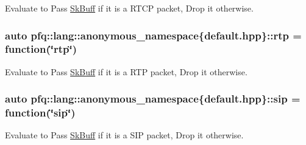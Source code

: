 Evaluate to {\ttfamily Pass} \hyperlink{structpfq_1_1lang_1_1SkBuff}{Sk\+Buff} if it is a R\+T\+CP packet, {\ttfamily Drop} it otherwise. 

\subsubsection[{\texorpdfstring{rtp}{rtp}}]{\setlength{\rightskip}{0pt plus 5cm}auto pfq\+::lang\+::anonymous\+\_\+namespace\{default.\+hpp\}\+::rtp = {\bf function}(\char`\"{}rtp\char`\"{})}\hypertarget{namespacepfq_1_1lang_1_1anonymous__namespace_02default_8hpp_03_aa8ac230fe8eeb0bccee8e31ba032cb8e}{}\label{namespacepfq_1_1lang_1_1anonymous__namespace_02default_8hpp_03_aa8ac230fe8eeb0bccee8e31ba032cb8e}


Evaluate to {\ttfamily Pass} \hyperlink{structpfq_1_1lang_1_1SkBuff}{Sk\+Buff} if it is a R\+TP packet, {\ttfamily Drop} it otherwise. 

\subsubsection[{\texorpdfstring{sip}{sip}}]{\setlength{\rightskip}{0pt plus 5cm}auto pfq\+::lang\+::anonymous\+\_\+namespace\{default.\+hpp\}\+::sip = {\bf function}(\char`\"{}sip\char`\"{})}\hypertarget{namespacepfq_1_1lang_1_1anonymous__namespace_02default_8hpp_03_a3ac0338626e771b43b200663e095aa36}{}\label{namespacepfq_1_1lang_1_1anonymous__namespace_02default_8hpp_03_a3ac0338626e771b43b200663e095aa36}


Evaluate to {\ttfamily Pass} \hyperlink{structpfq_1_1lang_1_1SkBuff}{Sk\+Buff} if it is a S\+IP packet, {\ttfamily Drop} it otherwise. 

